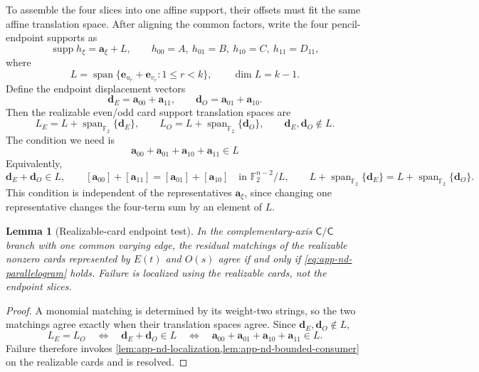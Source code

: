 \documentclass[11pt,letterpaper,onecolumn]{article}
\theoremstyle{plain}
\newtheorem{lemma}[lemma]{Lemma}
\theoremstyle{definition}
\theoremstyle{remark}
\newcommand{\Ftwo}{\mathbb F_2}
\newcommand{\Span}{\operatorname{span}}
\newcommand{\supp}{\operatorname{supp}}
\begin{document}
To assemble the four slices into one affine support, their offsets must
fit the same affine translation space. After aligning the common factors,
write the four pencil-endpoint supports as
\begin{equation*}
  \supp h_\xi={\mathbf{a}}_\xi+L,
  \qquad
  h_{00}=A,\ h_{01}=B,\ h_{10}=C,\ h_{11}=D_{11},
\end{equation*}
where
\begin{equation*}
  L=\Span\{{\mathbf{e}}_{u_r}+{\mathbf{e}}_{v_r}:1\le r<k\},
  \qquad
  \dim L=k-1.
\end{equation*}
Define the endpoint displacement vectors
\begin{equation*}
  {\mathbf{d}}_E={\mathbf{a}}_{00}+{\mathbf{a}}_{11},
  \qquad
  {\mathbf{d}}_O={\mathbf{a}}_{01}+{\mathbf{a}}_{10}.
\end{equation*}
Then the realizable even/odd card support translation spaces are
\begin{equation*}
  L_E=L+\Span_{\Ftwo}\{{\mathbf{d}}_E\},
  \qquad
  L_O=L+\Span_{\Ftwo}\{{\mathbf{d}}_O\},
  \qquad {\mathbf{d}}_E,{\mathbf{d}}_O\notin L.
\end{equation*}
The condition we need is
\begin{equation}
 {\mathbf{a}}_{00}+{\mathbf{a}}_{01}+{\mathbf{a}}_{10}+{\mathbf{a}}_{11}\in L
 \label{eq:app-nd-parallelogram}
\end{equation}
Equivalently,
\[
 {\mathbf{d}}_E+{\mathbf{d}}_O\in L,
 \qquad
 [{\mathbf{a}}_{00}]+[{\mathbf{a}}_{11}]=[{\mathbf{a}}_{01}]+[{\mathbf{a}}_{10}]
       \quad\text{in }\Ftwo^{n-2}/L,
 \qquad
 L+\Span_{\Ftwo}\{{\mathbf{d}}_E\}=L+\Span_{\Ftwo}\{{\mathbf{d}}_O\}.
\]
This condition is independent of the representatives
\({\mathbf{a}}_\xi\), since changing one representative changes the four-term sum by
an element of \(L\).

\begin{lemma}[Realizable-card endpoint test]
\label{lem:app-nd-parallelogram}
In the complementary-axis \(\mathsf{C}/\mathsf{C}\) branch with one common varying edge, the
residual matchings of
the realizable nonzero cards represented by \(E(t)\) and \(O(s)\) agree if
and only if
\cref{eq:app-nd-parallelogram} holds.
Failure is localized using the realizable cards, not the endpoint slices.
\end{lemma}

\begin{proof}
A monomial matching is determined by its weight-two strings, so the two
matchings agree exactly when their translation spaces agree.  Since
\({\mathbf{d}}_E,{\mathbf{d}}_O\notin L\),
\[
  L_E=L_O
  \quad\Longleftrightarrow\quad
  {\mathbf{d}}_E+{\mathbf{d}}_O\in L
  \quad\Longleftrightarrow\quad
  {\mathbf{a}}_{00}+{\mathbf{a}}_{01}+{\mathbf{a}}_{10}+{\mathbf{a}}_{11}\in L.
\]
Failure therefore invokes
\cref{lem:app-nd-localization,lem:app-nd-bounded-consumer} on the realizable
cards and is resolved.
\end{proof}
\end{document}
